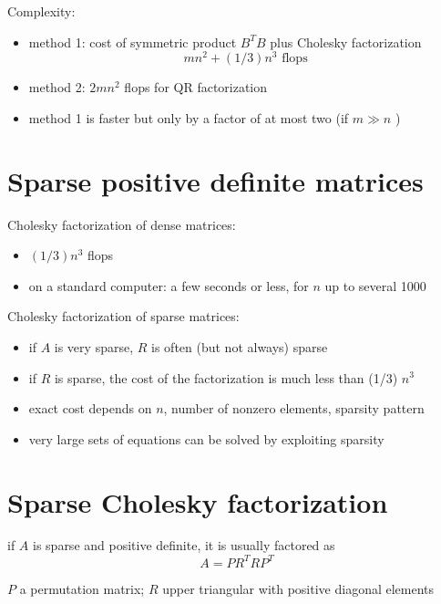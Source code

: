 Complexity:
\begin{itemize}
    \item method 1: cost of symmetric product $ B^{T} B $ plus Cholesky factorization
\begin{equation}
m n^{2}+(1 / 3) n^{3} \text { flops }
\end{equation}
    \item method 2: $ 2 m n^{2} $ flops for QR factorization
    \item method 1 is faster but only by a factor of at most two (if $ m \gg n $ )
\end{itemize}


\section{Sparse positive definite matrices}

Cholesky factorization of dense matrices:
\begin{itemize}
    \item $ (1 / 3) n^{3} $ flops
    \item on a standard computer: a few seconds or less, for $ n $ up to several 1000
\end{itemize}

Cholesky factorization of sparse matrices:
\begin{itemize}
    \item if $ A $ is very sparse, $ R $ is often (but not always) sparse
    \item if $ R $ is sparse, the cost of the factorization is much less than (1/3) $ n^{3} $
    \item exact cost depends on $ n $, number of nonzero elements, sparsity pattern
    \item very large sets of equations can be solved by exploiting sparsity
\end{itemize}

\section{Sparse Cholesky factorization}

\begin{theorem}
    if $ A $ is sparse and positive definite, it is usually factored as
\begin{equation}
A=P R^{T} R P^{T}
\end{equation}

$ P $ a permutation matrix; $ R $ upper triangular with positive diagonal elements
\end{theorem}

